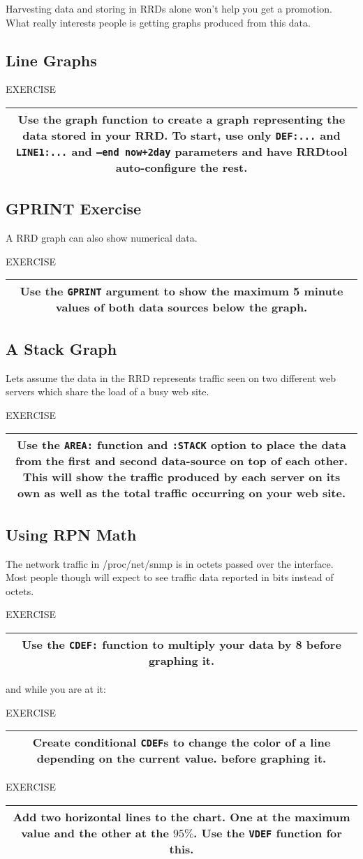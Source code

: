 \documentclass[a4paper,12pt]{article}
\newenvironment{work}{\textsf{\tiny EXERCISE}\nopagebreak\\[0.3ex]\begin{tabular}{|c|}
 \hline
 \begin{minipage}{0.965\linewidth}%
 \setlength{\parskip}{1.6ex plus 0.6ex minus 0.4ex}%
 \rule{0pt}{2.8ex}\ignorespaces}
{\rule[-1.8ex]{0pt}{0pt}\end{minipage}\\
 \hline
 \end{tabular}}
\newcommand{\ex}[1]{\subsection{#1}}
\newcommand{\cmd}[1]{\texttt{\mbox{#1}}}
\begin{document}
Harvesting data and storing in RRDs alone won't help you get a
promotion. What really interests people is getting graphs produced from
this data.

\ex{Line Graphs}


\begin{work}
Use the graph function to create a graph representing the data
stored in your RRD. To start, use only \cmd{DEF:...} and \cmd{LINE1:...}
and \cmd{--end now+2day} parameters and have RRDtool
auto-configure the rest. 
\end{work}

\ex{GPRINT Exercise}
A RRD graph can also show numerical data.

\begin{work}
  Use the \cmd{GPRINT} argument to show the maximum 5 minute values of
  both data sources below the graph.
\end{work}

\ex{A Stack Graph}
Lets assume the data in the RRD represents traffic seen on two
different web servers which share the load of a busy web site.

\begin{work}
  Use the \cmd{AREA:} function and \cmd{:STACK} option to place the data from
  the first and second data-source on top of each other. This will
  show the traffic produced by each server on its own as well as the
  total traffic occurring on your web site.
\end{work}

\ex{Using RPN Math}

The network traffic in /proc/net/snmp is in octets passed over the
interface. Most people though will expect to see traffic data reported in
bits instead of octets.

\begin{work}
Use the \cmd{CDEF:} function to multiply your data by 8
before graphing it.
\end{work}

and while you are at it:

\begin{work}
Create  conditional \cmd{CDEF}s to change the color of a line depending on the current value.
before graphing it.
\end{work}

\begin{work}
Add two horizontal lines to the chart. One at the maximum value and the other at the $95\%$. Use the \cmd{VDEF} function for this.
\end{work}
\end{document}
